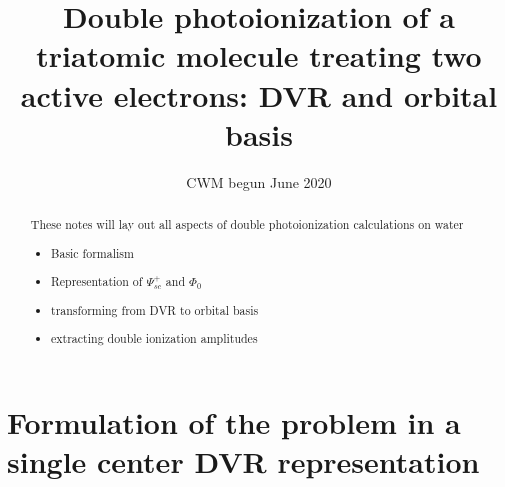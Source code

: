 \documentclass[%
pra%
,twocolumn%
,amssymb, nobibnotes, aps,
longbibliography
]{revtex4-1}
\begin{document}
\title{
Double photoionization of a triatomic molecule  treating two active electrons: DVR and orbital basis
}
\author{CWM begun June 2020 }
%
\begin{abstract}
These notes will lay out all aspects of double photoionization calculations on water
\begin{itemize}
\item {Basic formalism}
\item {Representation of $\Psi_{sc}^+$ and $\Phi_0$}
\item {transforming from DVR to orbital basis}
\item{ extracting double ionization amplitudes}
\end{itemize}   
\end{abstract}
%
\maketitle
\tableofcontents
%
%
%
\section{Formulation of the problem in a single center DVR representation}
\label{sec:formulation}
\end{document}
